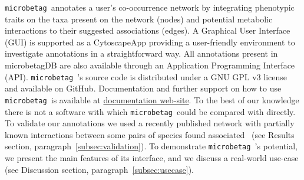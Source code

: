 \documentclass[sn-mathphys,Numbered]{sn-jnl}  %
\theoremstyle{thmstyleone}%
\theoremstyle{thmstyletwo}%
\theoremstyle{thmstylethree}%
\newcommand{\microbetag}{\texttt{microbetag }}
\begin{document}
    \microbetag annotates a user's co-occurrence network by integrating phenotypic traits on the taxa present on the network (nodes) and potential metabolic interactions to their suggested associations (edges).
    A Graphical User Interface (GUI) is supported as a CytoscapeApp providing a user-friendly environment to investigate annotations in a straightforward way.
    All annotations present in microbetagDB are also available through an Application Programming Interface (API).
    \microbetag's source code is distributed under a GNU GPL v3 license and available on GitHub. 
    Documentation and further support on how to use \microbetag is available at \href{https://hariszaf.github.io/microbetag/}{documentation web-site}.
    To the best of our knowledge there is not a software with which \microbetag could be compared with directly. 
    To validate our annotations we used a recently published network with partially known interactions between some pairs of species found associated~\cite{hessler2023vitamin} (see Results section, paragraph~\ref{subsec:validation}).    
    To demonstrate \microbetag's potential, we present the main features of its interface, and we discuss a real-world use-case (see Discussion section, paragraph~\ref{subsec:usecase}).




\end{document}
